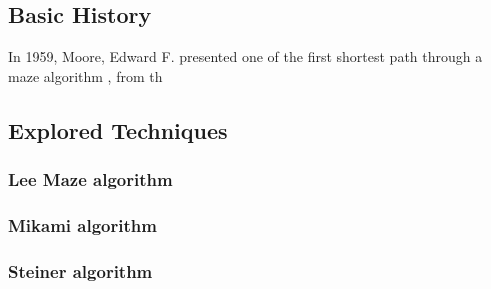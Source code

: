 \subsection{Basic History}
    In 1959, Moore, Edward F. presented one of the first shortest path through a maze algorithm
    \cite{Moore_1959}, from th
    



\subsection{Explored Techniques}
    \subsubsection{Lee Maze algorithm}
    \subsubsection{Mikami algorithm}
    \subsubsection{Steiner algorithm}
    
